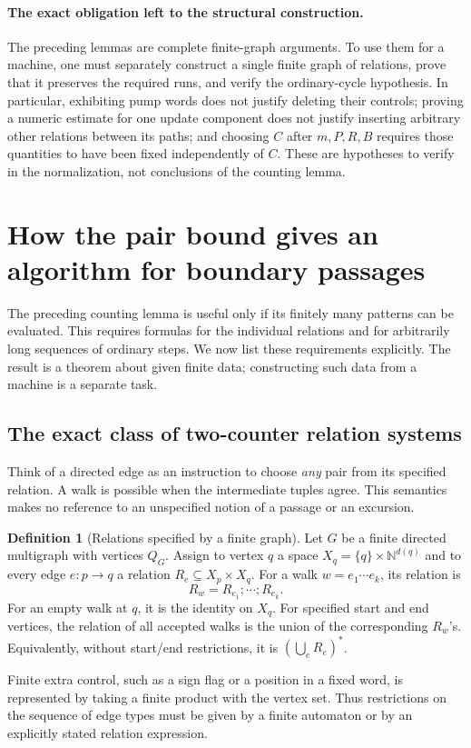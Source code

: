 \documentclass[11pt,a4paper]{article}
\theoremstyle{definition}
\newtheorem{definition}[theorem]{Definition}
\theoremstyle{remark}
\newcommand{\N}{\mathbb N}
\begin{document}
\paragraph{The exact obligation left to the structural construction.}
The preceding lemmas are complete finite-graph arguments. To use them
for a machine, one must separately construct a single finite graph of
relations, prove that it preserves the required runs, and verify the
ordinary-cycle hypothesis. In particular, exhibiting pump words
does not justify deleting their controls; proving a numeric estimate
for one update component does not justify inserting arbitrary other
relations between its paths; and choosing \(C\) after \(m,P,R,B\)
requires those quantities to have been fixed independently of \(C\).
These are hypotheses to verify in the normalization, not conclusions
of the counting lemma.


\section{How the pair bound gives an algorithm for boundary passages}
\label{sec:face-query}

The preceding counting lemma is useful only if its finitely many
patterns can be evaluated. This requires formulas for the individual
relations and for arbitrarily long sequences of ordinary steps.
We now list these requirements explicitly. The result is a theorem
about given finite data; constructing such data from a machine is a
separate task.

\subsection{The exact class of two-counter relation systems}

Think of a directed edge as an instruction to choose \emph{any} pair
from its specified relation. A walk is possible when the intermediate
tuples agree. This semantics makes no reference to an unspecified
notion of a passage or an excursion.

\begin{definition}[Relations specified by a finite graph]
\label{def:relational-graph}
Let \(G\) be a finite directed multigraph with vertices \(Q_G\).
Assign to vertex \(q\) a space \(X_q=\{q\}\times\N^{d(q)}\) and
to every edge \(e:p\to q\) a relation \(R_e\subseteq X_p\times X_q\).
For a walk \(w=e_1\cdots e_k\), its relation is
\[
 R_w=R_{e_1};\cdots;R_{e_k}.
\]
For an empty walk at \(q\), it is the identity on \(X_q\).
For specified start and end vertices, the relation of all accepted
walks is the union of the corresponding \(R_w\)'s.
Equivalently, without start/end restrictions, it is
\((\bigcup_e R_e)^*\).

Finite extra control, such as a sign flag or a position in a fixed
word, is represented by taking a finite product with the vertex set.
Thus restrictions on the sequence of edge types must be given by a
finite automaton or by an explicitly stated relation expression.
\end{definition}
\end{document}
